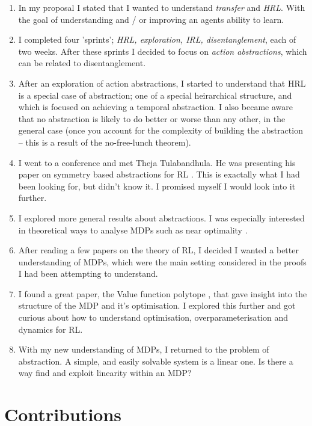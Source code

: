 \begin{enumerate}
  \tightlist
  \item In my proposal I stated that I wanted to understand \textit{transfer} and \textit{HRL}. With the goal of understanding and / or improving an agents ability to learn.
  \item I completed four 'sprints'; \textit{HRL, exploration, IRL, disentanglement}, each of two weeks. After these sprints I decided to focus on \textit{action abstractions},
  which can be related to disentanglement.
  \item After an exploration of action abstractions, I started to understand that HRL is a special case of abstraction; one of a special heirarchical structure, and which is focused on achieving a temporal abstraction. I also became aware that no abstraction is likely to do better or worse than any other, in the general case (once you account for the complexity of building the abstraction -- this is a result of the no-free-lunch theorem).
  \item I went to a conference and met Theja Tulabandhula. He was presenting his paper on symmetry based abstractions for RL \cite{Mahajan2017}. This is exactally what I had been looking for, but didn't know it. I promised myself I would look into it further.
  \item I explored more general results about abstractions. I was especially interested in theoretical ways to analyse MDPs such as near optimality \cite{Abel2017}.
  \item After reading a few papers on the theory of RL, I decided I wanted a better understanding of MDPs, which were the main setting considered in the proofs I had been attempting to understand.
  \item I found a great paper, the Value function polytope \cite{Dadashi2018}, that gave insight into the structure of the MDP and it's optimisation. I explored this further and got curious about how to understand optimisation, overparameterisation and dynamics for RL.
  \item With my new understanding of MDPs, I returned to the problem of abstraction. A simple, and easily solvable system is a linear one. Is there a way find and exploit linearity within an MDP?
\end{enumerate}

\section{Contributions}

